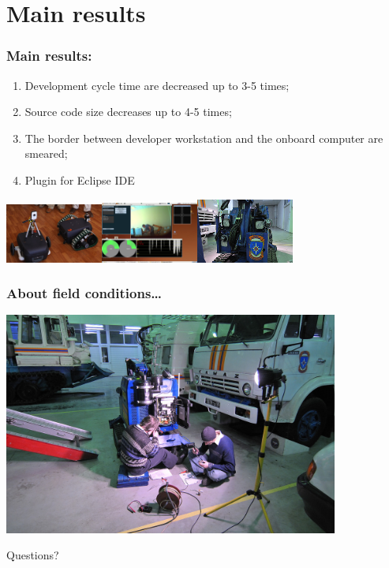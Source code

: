 \documentclass{beamer}
\begin{document}
\section{Main results}
\begin{frame}
\frametitle{Main results:}
\begin{enumerate}
  \item<1> Development cycle time are decreased up to 3-5 times;
  \item<1> Source code size decreases up to 4-5 times;
  \item<1> The border between developer workstation and the onboard computer are smeared;
  \item<1> Plugin for Eclipse IDE
\end{enumerate}
\includegraphics[width=3.2cm]{rob1.jpg}\includegraphics[width=3.2cm]{rob2.jpg}\includegraphics[width=3.2cm]{rob3.jpg}
\end{frame}

\begin{frame}
\frametitle{About field conditions\ldots}
\includegraphics[width=11cm]{robot_big.jpg}
\end{frame}

\begin{frame}
\begin{center}
\begin{LARGE}
Questions?
\end{LARGE}
\end{center}
\end{frame}
\end{document}
